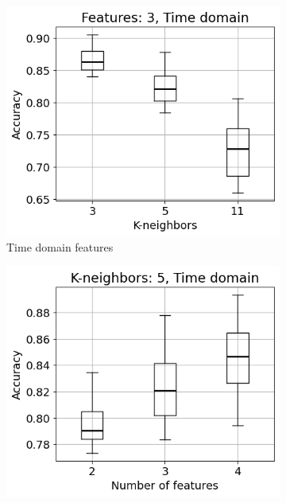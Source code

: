 \begin{figure}[h]
    \centering
    \begin{subfigure}[b]{0.48\textwidth}
        \includegraphics[width=\textwidth]{assets/results/feature-combinations/TD-3-A+B-True-False-F3.png}
        \caption{Time domain features}
    \end{subfigure}
    \hfill
    \begin{subfigure}[b]{0.48\textwidth}
        \includegraphics[width=\textwidth]{assets/results/feature-combinations/TD-3-A+B-True-False-K5.png}

\end{subfigure}
\end{figure}
